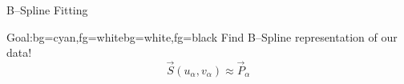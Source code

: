 \begin{frame}{B--Spline Fitting}

\begin{figure}
\end{figure}
%
%
%

\begin{variableblock}{Goal:}{bg=cyan,fg=white}{bg=white,fg=black}
{
Find B--Spline representation of our data!\\
\begin{equation*}
\vec{S}\left(u_\alpha,v_\alpha\right) \approx \vec{P}_{\alpha} 
\end{equation*}
}
\end{variableblock}

\end{frame}

